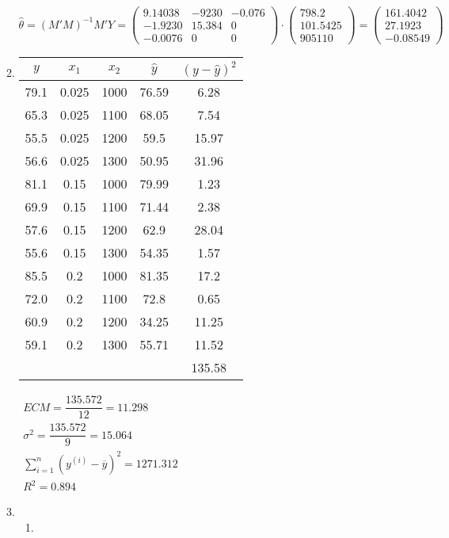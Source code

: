 \begin{enumerate}[label=\color{red}\arabic*),leftmargin=*]
\begin{enumerate}[label=\color{red}\alph*)]
	$\hat{\theta}=(M'M)^{-1}M'Y=\begin{pmatrix}
		9.14038 & -9230 & -0.076 \\
		-1.9230 & 15.384 & 0 \\
		-0.0076 & 0 & 0
	\end{pmatrix}\cdot\begin{pmatrix}
	798.2\\
	101.5425\\
	905110
	\end{pmatrix}=\begin{pmatrix}
	161.4042\\
	27.1923\\
	-0.08549
	\end{pmatrix}$
	\item {}
	
	
	\begin{tabular}{|c|c|c|c|c|}
		\hline
		$y$ & $x_1$ & $x_2$ & $\hat{y}$ & $(y-\hat{y})^2$\\
		\hline
		79.1 & 0.025 & 1000 & 76.59 & 6.28\\
		65.3 & 0.025 & 1100 & 68.05 & 7.54\\
		55.5 & 0.025 & 1200 & 59.5 & 15.97\\
		56.6 & 0.025 & 1300 & 50.95 & 31.96\\
		81.1 & 0.15 & 1000 & 79.99 & 1.23\\
		69.9 & 0.15 & 1100 & 71.44 & 2.38\\
		57.6 & 0.15 & 1200 & 62.9 & 28.04\\
		55.6 & 0.15 & 1300 & 54.35 & 1.57\\
		85.5 & 0.2 & 1000 & 81.35 & 17.2\\
		72.0 & 0.2 & 1100 & 72.8 & 0.65\\
		60.9 & 0.2 & 1200 & 34.25 & 11.25\\
		59.1 & 0.2 & 1300 & 55.71 & 11.52\\ \hline
		 & & & & 135.58 \\ \hline
	\end{tabular}
	
	$\begin{array}{l}
		ECM=\dfrac{135.572}{12}=11.298\\
		\sigma^2=\dfrac{135.572}{9}=15.064\\
		\sum_{i=1}^{n}(y^{(i)}-\overline{y})^2=1271.312\\
		R^2=0.894
	\end{array}$
	\item {}
	\begin{enumerate}[label=\color{red}\arabic*)]
		\item {}
		

\end{enumerate}
\end{enumerate}
\end{enumerate}
